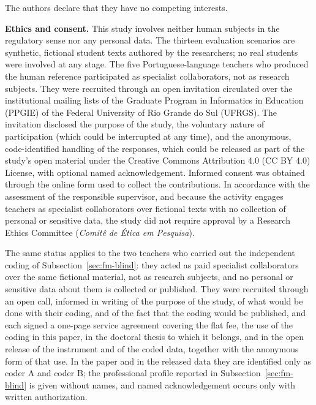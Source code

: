 \documentclass{sbc2023}%
\begin{document}
\begin{interests}
The authors declare that they have no competing interests.
\end{interests}

\noindent\textbf{Ethics and consent.} This study involves neither human subjects in the regulatory sense nor any personal data. The thirteen evaluation scenarios are synthetic, fictional student texts authored by the researchers; no real students were involved at any stage. The five Portuguese-language teachers who produced the human reference participated as specialist collaborators, not as research subjects. They were recruited through an open invitation circulated over the institutional mailing lists of the Graduate Program in Informatics in Education (PPGIE) of the Federal University of Rio Grande do Sul (UFRGS). The invitation disclosed the purpose of the study, the voluntary nature of participation (which could be interrupted at any time), and the anonymous, code-identified handling of the responses, which could be released as part of the study's open material under the Creative Commons Attribution 4.0 (CC BY 4.0) License, with optional named acknowledgement. Informed consent was obtained through the online form used to collect the contributions. In accordance with the assessment of the responsible supervisor, and because the activity engages teachers as specialist collaborators over fictional texts with no collection of personal or sensitive data, the study did not require approval by a Research Ethics Committee (\textit{Comitê de Ética em Pesquisa}).

\noindent The same status applies to the two teachers who carried out the independent coding of Subsection~\ref{sec:fm-blind}: they acted as paid specialist collaborators over the same fictional material, not as research subjects, and no personal or sensitive data about them is collected or published. They were recruited through an open call, informed in writing of the purpose of the study, of what would be done with their coding, and of the fact that the coding would be published, and each signed a one-page service agreement covering the flat fee, the use of the coding in this paper, in the doctoral thesis to which it belongs, and in the open release of the instrument and of the coded data, together with the anonymous form of that use. In the paper and in the released data they are identified only as coder A and coder B; the professional profile reported in Subsection~\ref{sec:fm-blind} is given without names, and named acknowledgement occurs only with written authorization.
\end{document}
